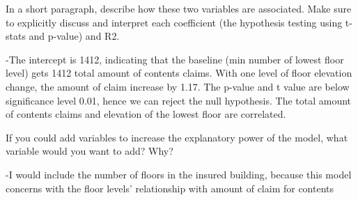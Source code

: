 \documentclass[
]{article}
\begin{document}
In a short paragraph, describe how these two variables are associated.
Make sure to explicitly discuss and interpret each coefficient (the
hypothesis testing using t-stats and p-value) and R2.

-The intercept is 1412, indicating that the baseline (min number of
lowest floor level) gets 1412 total amount of contents claims. With one
level of floor elevation change, the amount of claim increase by 1.17.
The p-value and t value are below significance level 0.01, hence we can
reject the null hypothesis. The total amount of contents claims and
elevation of the lowest floor are correlated.

If you could add variables to increase the explanatory power of the
model, what variable would you want to add? Why?

-I would include the number of floors in the insured building, because
this model concerns with the floor levels' relationship with amount of
claim for contents
\end{document}
